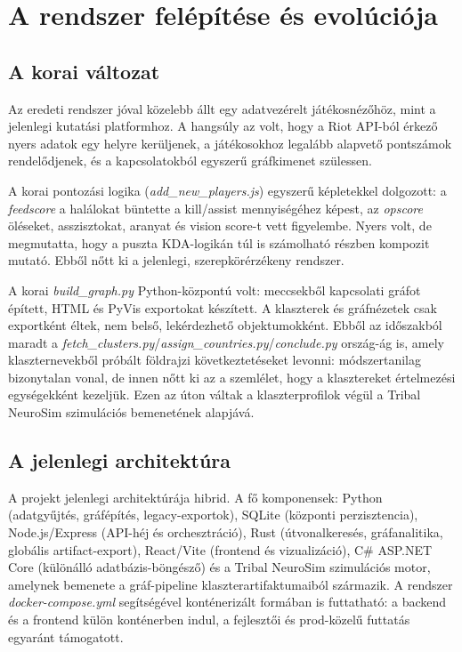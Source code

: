 \chapter{A rendszer felépítése és evolúciója}

\section{A korai változat}

Az eredeti rendszer jóval közelebb állt egy adatvezérelt játékosnézőhöz, mint a jelenlegi kutatási platformhoz. A hangsúly az volt, hogy a Riot API-ból érkező nyers adatok egy helyre kerüljenek, a játékosokhoz legalább alapvető pontszámok rendelődjenek, és a kapcsolatokból egyszerű gráfkimenet szülessen.

A korai pontozási logika (\textit{add\_new\_players.js}) egyszerű képletekkel dolgozott: a \textit{feedscore} a halálokat büntette a kill/assist mennyiségéhez képest, az \textit{opscore} öléseket, asszisztokat, aranyat és vision score-t vett figyelembe. Nyers volt, de megmutatta, hogy a puszta KDA-logikán túl is számolható részben kompozit mutató. Ebből nőtt ki a jelenlegi, szerepkörérzékeny rendszer.

A korai \textit{build\_graph.py} Python-központú volt: meccsekből kapcsolati gráfot épített, HTML és PyVis exportokat készített. A klaszterek és gráfnézetek csak exportként éltek, nem belső, lekérdezhető objektumokként. Ebből az időszakból maradt a \textit{fetch\_clusters.py}/\textit{assign\_countries.py}/\textit{conclude.py} ország-ág is, amely klaszternevekből próbált földrajzi következtetéseket levonni: módszertanilag bizonytalan vonal, de innen nőtt ki az a szemlélet, hogy a klasztereket értelmezési egységekként kezeljük. Ezen az úton váltak a klaszterprofilok végül a Tribal NeuroSim szimulációs bemenetének alapjává.


\section{A jelenlegi architektúra}

A projekt jelenlegi architektúrája hibrid. A fő komponensek: Python (adatgyűjtés, gráfépítés, legacy-exportok), SQLite (központi perzisztencia), Node.js/Express (API-héj és orchesztráció), Rust (útvonalkeresés, gráfanalitika, globális artifact-export), React/Vite (frontend és vizualizáció), C\# ASP.NET Core (különálló adatbázis-böngésző) és a Tribal NeuroSim szimulációs motor, amelynek bemenete a gráf-pipeline klaszterartifaktumaiból származik. A rendszer \textit{docker-compose.yml} segítségével konténerizált formában is futtatható: a backend és a frontend külön konténerben indul, a fejlesztői és prod-közelű futtatás egyaránt támogatott.

